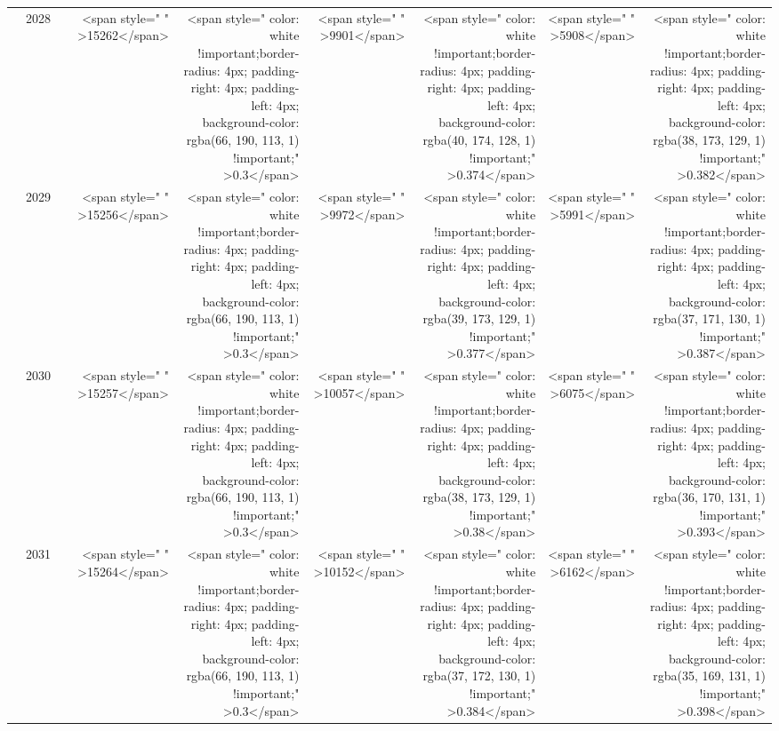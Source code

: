 \begin{table}
\begin{tabular}[t]{>{}l|l>{}rr>{}r|rrrr}
 & 2028 & \cellcolor[HTML]{858379}{\textcolor{white}{700}} & <span style="     " >15262</span> & <span style="     color: white !important;border-radius: 4px; padding-right: 4px; padding-left: 4px; background-color: rgba(66, 190, 113, 1) !important;" >0.3</span> & <span style="     " >9901</span> & <span style="     color: white !important;border-radius: 4px; padding-right: 4px; padding-left: 4px; background-color: rgba(40, 174, 128, 1) !important;" >0.374</span> & <span style="     " >5908</span> & <span style="     color: white !important;border-radius: 4px; padding-right: 4px; padding-left: 4px; background-color: rgba(38, 173, 129, 1) !important;" >0.382</span>\\

 & 2029 & \cellcolor[HTML]{858379}{\textcolor{white}{700}} & <span style="     " >15256</span> & <span style="     color: white !important;border-radius: 4px; padding-right: 4px; padding-left: 4px; background-color: rgba(66, 190, 113, 1) !important;" >0.3</span> & <span style="     " >9972</span> & <span style="     color: white !important;border-radius: 4px; padding-right: 4px; padding-left: 4px; background-color: rgba(39, 173, 129, 1) !important;" >0.377</span> & <span style="     " >5991</span> & <span style="     color: white !important;border-radius: 4px; padding-right: 4px; padding-left: 4px; background-color: rgba(37, 171, 130, 1) !important;" >0.387</span>\\

 & 2030 & \cellcolor[HTML]{858379}{\textcolor{white}{700}} & <span style="     " >15257</span> & <span style="     color: white !important;border-radius: 4px; padding-right: 4px; padding-left: 4px; background-color: rgba(66, 190, 113, 1) !important;" >0.3</span> & <span style="     " >10057</span> & <span style="     color: white !important;border-radius: 4px; padding-right: 4px; padding-left: 4px; background-color: rgba(38, 173, 129, 1) !important;" >0.38</span> & <span style="     " >6075</span> & <span style="     color: white !important;border-radius: 4px; padding-right: 4px; padding-left: 4px; background-color: rgba(36, 170, 131, 1) !important;" >0.393</span>\\

 & 2031 & \cellcolor[HTML]{858379}{\textcolor{white}{700}} & <span style="     " >15264</span> & <span style="     color: white !important;border-radius: 4px; padding-right: 4px; padding-left: 4px; background-color: rgba(66, 190, 113, 1) !important;" >0.3</span> & <span style="     " >10152</span> & <span style="     color: white !important;border-radius: 4px; padding-right: 4px; padding-left: 4px; background-color: rgba(37, 172, 130, 1) !important;" >0.384</span> & <span style="     " >6162</span> & <span style="     color: white !important;border-radius: 4px; padding-right: 4px; padding-left: 4px; background-color: rgba(35, 169, 131, 1) !important;" >0.398</span>\\


\end{tabular}
\end{table}
